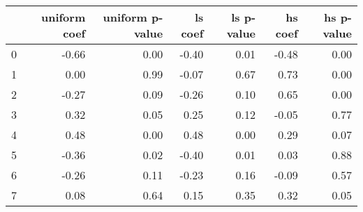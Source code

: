 \begin{tabular}{lrrrrrr}
\toprule
 & uniform coef & uniform p-value & ls coef & ls p-value & hs coef & hs p-value \\
\midrule
0 & -0.66 & 0.00 & -0.40 & 0.01 & -0.48 & 0.00 \\
1 & 0.00 & 0.99 & -0.07 & 0.67 & 0.73 & 0.00 \\
2 & -0.27 & 0.09 & -0.26 & 0.10 & 0.65 & 0.00 \\
3 & 0.32 & 0.05 & 0.25 & 0.12 & -0.05 & 0.77 \\
4 & 0.48 & 0.00 & 0.48 & 0.00 & 0.29 & 0.07 \\
5 & -0.36 & 0.02 & -0.40 & 0.01 & 0.03 & 0.88 \\
6 & -0.26 & 0.11 & -0.23 & 0.16 & -0.09 & 0.57 \\
7 & 0.08 & 0.64 & 0.15 & 0.35 & 0.32 & 0.05 \\
\bottomrule
\end{tabular}
